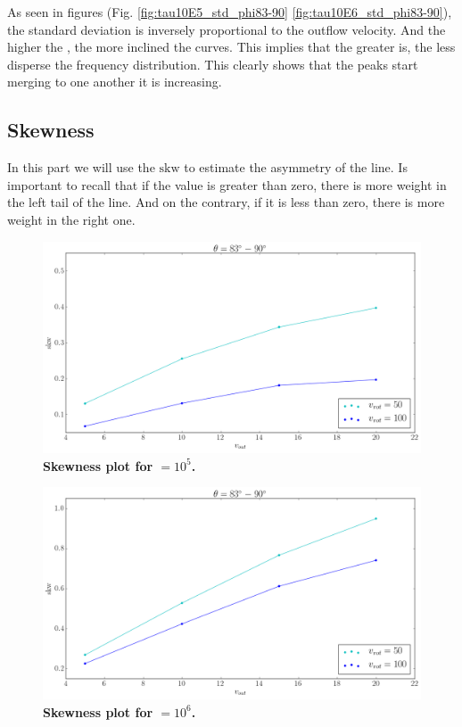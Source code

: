 As seen in figures (Fig. \ref{fig:tau10E5_std_phi83-90} \ref{fig:tau10E6_std_phi83-90}), the standard deviation is inversely proportional to the outflow velocity. And the higher the \tauh, the more inclined the curves. This implies that the greater \vout is, the less disperse the \lya frequency distribution. This clearly shows that the peaks start merging to one another it \vout is increasing.\\

\subsection{Skewness}
In this part we will use the $\mathrm{skw}$ to estimate the asymmetry of the \lya line. Is important to recall that if the value is greater than zero, there is more weight in the left tail of the line. And on the contrary, if it is less than zero, there is more weight in the right one.\\

\begin{figure}[h!]
	\begin{center}
		\includegraphics[width=1\textwidth]{./figures/chapter3/tau10E5_skw_phi83-90}
	\end{center}
	\caption{\textbf{Skewness plot for \tauh$=10^5$.} 
		\label{fig:tau10E5_skw_phi83-90}}
\end{figure}

\begin{figure}[h!]
	\begin{center}
		\includegraphics[width=1\textwidth]{./figures/chapter3/tau10E6_skw_phi83-90}
	\end{center}
	\caption{\textbf{Skewness plot for \tauh$=10^6$.} 
		\label{fig:tau10E6_skw_phi83-90}}
\end{figure}


